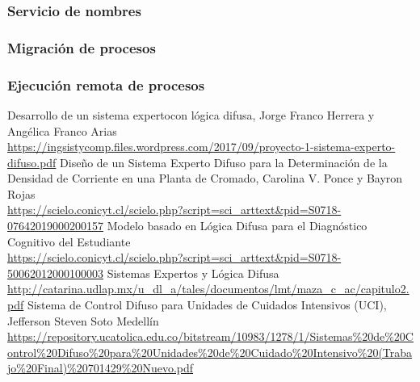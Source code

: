 \documentclass[a4paper, 11pt, titlepage]{article}
\begin{document}
        \subsubsection{Servicio de nombres}

        \subsubsection{Migración de procesos}

        \subsubsection{Ejecución remota de procesos}

\newpage
\begin{thebibliography}{X}
    \bibitem{} Desarrollo de un sistema expertocon lógica difusa, Jorge Franco Herrera y Angélica Franco Arias \\ \url{https://ingsistycomp.files.wordpress.com/2017/09/proyecto-1-sistema-experto-difuso.pdf}
    \bibitem{} Diseño de un Sistema Experto Difuso para la Determinación de la Densidad de Corriente en una Planta de Cromado, Carolina V. Ponce y Bayron Rojas \\ \url{https://scielo.conicyt.cl/scielo.php?script=sci_arttext&pid=S0718-07642019000200157}
    \bibitem{} Modelo basado en Lógica Difusa para el Diagnóstico Cognitivo del Estudiante \\ \url{https://scielo.conicyt.cl/scielo.php?script=sci_arttext&pid=S0718-50062012000100003}
    \bibitem{} Sistemas Expertos y Lógica Difusa \\ \url{http://catarina.udlap.mx/u_dl_a/tales/documentos/lmt/maza_c_ac/capitulo2.pdf}
    \bibitem{} Sistema de Control Difuso para Unidades de Cuidados Intensivos (UCI), Jefferson Steven Soto Medellín \\ \url{https://repository.ucatolica.edu.co/bitstream/10983/1278/1/Sistemas%20de%20Control%20Difuso%20para%20Unidades%20de%20Cuidado%20Intensivo%20(Trabajo%20Final)%20701429%20Nuevo.pdf}
\end{thebibliography}
\end{document}
